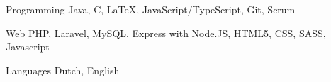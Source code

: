 


\begin{cvskills}


\cvskill
{Programming} %
{Java, C, LaTeX, JavaScript/TypeScript, Git, Scrum} %


\cvskill
{Web} %
{PHP, Laravel, MySQL, Express with Node.JS, HTML5, CSS, SASS, Javascript} %


\cvskill
{Languages} %
{Dutch, English} %


\end{cvskills}